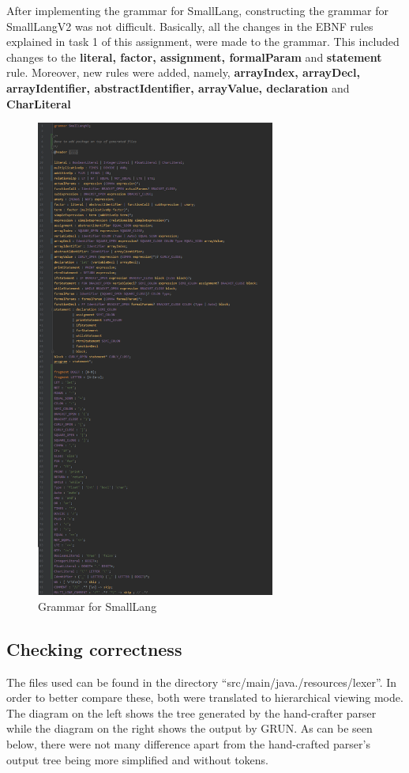 \documentclass{article}
\newcommand{\quotes}[1]{``#1''}
\begin{document}
			After implementing the grammar for SmallLang, constructing the grammar for SmallLangV2 was not difficult. Basically, all the changes in the EBNF rules explained in task 1 of this assignment, were made to the grammar.  This included changes to the \textbf{literal, factor, assignment, formalParam} and \textbf{statement} rule. Moreover, new rules were added, namely, \textbf{arrayIndex, arrayDecl, arrayIdentifier, abstractIdentifier, arrayValue, declaration} and \textbf{CharLiteral}
			
								\begin{figure}[H]
					\centering
			 			\includegraphics[width=0.7\textwidth]{smallangv2gr.png}
			  			\caption{Grammar for SmallLang}
			  			\label{fig:smalllanggr}
					\end{figure}
					
					
					
		\subsection{Checking correctness}
		The files used can be found in the directory \quotes{src/main/java./resources/lexer}. In order to better compare these, both were translated to hierarchical viewing mode. The diagram on the left shows the tree generated by the hand-crafter parser while the diagram on the right shows the output by GRUN.  As can be seen below, there were not many difference apart from the hand-crafted parser's output tree being more simplified and without tokens.
		
\end{document}
